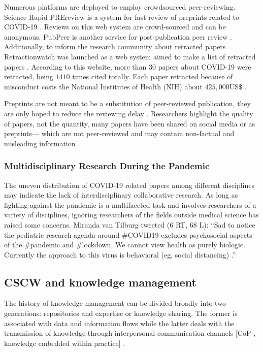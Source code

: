 \documentclass[acmsmall,authordraft]{acmart}
\begin{document}
Numerous platforms are deployed to employ crowdsourced peer-reviewing. Science Rapid PREreview is a system for fast review of preprints related to COVID-19 \citep{johansson2020open}. Reviews on this web system are crowd-sourced and can be anonymous\citep{schwab2020science}. PubPeer is another service for post-publication peer review \citep{langham2019discovery}. Additionally, to inform the research community about retracted papers Retractionwatch was launched as a web system aimed to make a list of retracted papers \citep{dinis2020covid}. According to this website, more than $30$ papers about COVID-19 were retracted, being $1410$ times cited totally. Each paper retracted because of misconduct costs the National Institutes of Health (NIH) about $425,000$US\$ \citep{dinis2020covid}. 

Preprints are not meant to be a substitution of peer-reviewed publication, they are only hoped to reduce the reviewing delay \citep{langham2019discovery}. Researchers highlight the quality of papers, not the quantity, many papers have been shared on social media or as preprints— which are not peer-reviewed and may contain non-factual and misleading information \citep{Kupferschmidt2020culture, xiao2020hiv, konermann2020twitter}.


\subsubsection{Multidisciplinary Research During the Pandemic}
\label{Multidisciplinary Research During the Pandemic}

The uneven distribution of COVID-19 related papers among different disciplines \cite{haghani2020covid} may indicate the lack of interdisciplinary collaborative research. As long as fighting against the pandemic is a multifaceted task and involves researchers of a variety of disciplines, ignoring researchers of the fields outside medical science has raised some concerns.
Miranda van Tilburg tweeted ($6$ RT, $68$ L): ``Sad to notice the pediatric research agenda around \#COVID19 excludes psychosocial aspects of the \#pandemic and \#lockdown. We cannot view health as purely biologic. Currently the approach to this virus is behavioral (eg, social distancing) \citep{Tilburg2020twitter}.''



\subsection{CSCW and knowledge management}
\label{CSCW and knowledge management}
The history of knowledge management can be divided broadly into two generations: repositories and expertise or knowledge sharing. The former is associated with data and information flows while the latter deals with the transmission of knowledge through interpersonal communication channels [CoP , knowledge embedded within practice] \citep{ackerman2013sharing}. 
\end{document}
